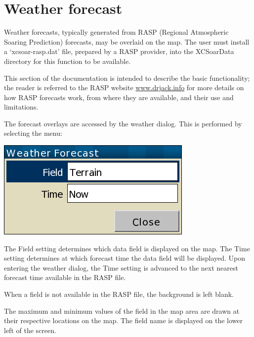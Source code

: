 \section{Weather forecast}\label{sec:weather-forecast}

Weather forecasts, typically generated from RASP (Regional Atmospheric
Soaring Prediction) forecasts, may be overlaid on the map.  The user
must install a `xcsoar-rasp.dat' file, prepared by a RASP provider,
into the XCSoarData directory for this function to be available.

This section of the documentation is intended to describe the basic
functionality; the reader is referred to the RASP website
\url{www.drjack.info} for more details on how RASP forecasts work, from where they are available, and their use and limitations.

The forecast overlays are accessed by the weather dialog.  This is
performed by selecting the menu:
\begin{quote}
\blink{}\blink{}
\end{quote}

\begin{center}
\includegraphics[angle=0,width=0.5\linewidth,keepaspectratio='true']{figures/dialog-weather.png}
\end{center}

The Field setting determines which data field is displayed on the map.
The Time setting determines at which forecast time the data field will
be displayed.  Upon entering the weather dialog, the Time setting is
advanced to the next nearest forecast time available in the RASP file.

When a field is not available in the RASP file, the background is left blank.

The maximum and minimum values of the field in the map area are drawn
at their respective locations on the map.  The field name is displayed
on the lower left of the screen.

